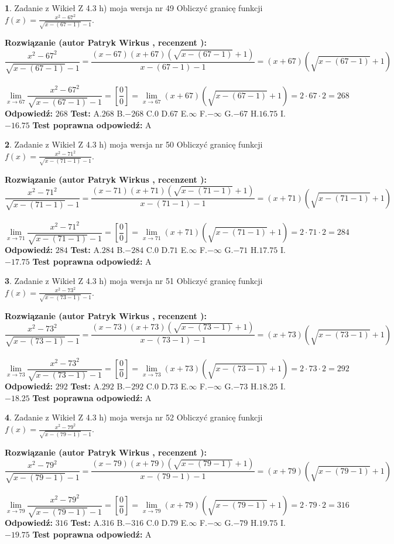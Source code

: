 \documentclass[12pt, a4paper]{article}
\theoremstyle{definition} %
\newtheorem{zad}{}
\newcommand{\zadStart}[1]{\begin{zad}#1\newline}
\newcommand{\zadStop}{\end{zad}}
\newcommand{\rozwStart}[2]{\noindent \textbf{Rozwiązanie (autor #1 , recenzent #2): }\newline}
\newcommand{\rozwStop}{\newline}
\newcommand{\odpStart}{\noindent \textbf{Odpowiedź:}\newline}
\newcommand{\odpStop}{\newline}
\newcommand{\testStart}{\noindent \textbf{Test:}\newline}
\newcommand{\testStop}{\newline}
\newcommand{\kluczStart}{\noindent \textbf{Test poprawna odpowiedź:}\newline}
\newcommand{\kluczStop}{\newline}
\begin{document}
\zadStart{Zadanie z Wikieł Z 4.3 h) moja wersja nr 49}
Obliczyć granicę funkcji $f(x)=\frac{x^{2} - 67^{2}}{\sqrt{x-(67-1)}-1}$.
\zadStop
\rozwStart{Patryk Wirkus}{}
$$\frac{x^{2} - 67^{2}}{\sqrt{x-(67-1)}-1}=\frac{(x-67)(x+67)(\sqrt{x-(67-1)}+1)}{x-(67-1)-1}=(x+67)(\sqrt{x-(67-1)}+1)$$
\\
$$\lim\limits_{x\to 67}\frac{x^{2} - 67^{2}}{\sqrt{x-(67-1)}-1}=[\frac{0}{0}]=
\lim\limits_{x\to 67}(x+67)(\sqrt{x-(67-1)}+1) = 2\cdot67 \cdot 2 = 268$$
\rozwStop
\odpStart
$268$
\odpStop
\testStart
A.$268$
B.$-268$
C.$0$
D.$67$
E.$\infty$
F.$-\infty$
G.$-67$
H.$16.75$
I.$-16.75$
\testStop
\kluczStart
A
\kluczStop



\zadStart{Zadanie z Wikieł Z 4.3 h) moja wersja nr 50}
Obliczyć granicę funkcji $f(x)=\frac{x^{2} - 71^{2}}{\sqrt{x-(71-1)}-1}$.
\zadStop
\rozwStart{Patryk Wirkus}{}
$$\frac{x^{2} - 71^{2}}{\sqrt{x-(71-1)}-1}=\frac{(x-71)(x+71)(\sqrt{x-(71-1)}+1)}{x-(71-1)-1}=(x+71)(\sqrt{x-(71-1)}+1)$$
\\
$$\lim\limits_{x\to 71}\frac{x^{2} - 71^{2}}{\sqrt{x-(71-1)}-1}=[\frac{0}{0}]=
\lim\limits_{x\to 71}(x+71)(\sqrt{x-(71-1)}+1) = 2\cdot71 \cdot 2 = 284$$
\rozwStop
\odpStart
$284$
\odpStop
\testStart
A.$284$
B.$-284$
C.$0$
D.$71$
E.$\infty$
F.$-\infty$
G.$-71$
H.$17.75$
I.$-17.75$
\testStop
\kluczStart
A
\kluczStop



\zadStart{Zadanie z Wikieł Z 4.3 h) moja wersja nr 51}
Obliczyć granicę funkcji $f(x)=\frac{x^{2} - 73^{2}}{\sqrt{x-(73-1)}-1}$.
\zadStop
\rozwStart{Patryk Wirkus}{}
$$\frac{x^{2} - 73^{2}}{\sqrt{x-(73-1)}-1}=\frac{(x-73)(x+73)(\sqrt{x-(73-1)}+1)}{x-(73-1)-1}=(x+73)(\sqrt{x-(73-1)}+1)$$
\\
$$\lim\limits_{x\to 73}\frac{x^{2} - 73^{2}}{\sqrt{x-(73-1)}-1}=[\frac{0}{0}]=
\lim\limits_{x\to 73}(x+73)(\sqrt{x-(73-1)}+1) = 2\cdot73 \cdot 2 = 292$$
\rozwStop
\odpStart
$292$
\odpStop
\testStart
A.$292$
B.$-292$
C.$0$
D.$73$
E.$\infty$
F.$-\infty$
G.$-73$
H.$18.25$
I.$-18.25$
\testStop
\kluczStart
A
\kluczStop



\zadStart{Zadanie z Wikieł Z 4.3 h) moja wersja nr 52}
Obliczyć granicę funkcji $f(x)=\frac{x^{2} - 79^{2}}{\sqrt{x-(79-1)}-1}$.
\zadStop
\rozwStart{Patryk Wirkus}{}
$$\frac{x^{2} - 79^{2}}{\sqrt{x-(79-1)}-1}=\frac{(x-79)(x+79)(\sqrt{x-(79-1)}+1)}{x-(79-1)-1}=(x+79)(\sqrt{x-(79-1)}+1)$$
\\
$$\lim\limits_{x\to 79}\frac{x^{2} - 79^{2}}{\sqrt{x-(79-1)}-1}=[\frac{0}{0}]=
\lim\limits_{x\to 79}(x+79)(\sqrt{x-(79-1)}+1) = 2\cdot79 \cdot 2 = 316$$
\rozwStop
\odpStart
$316$
\odpStop
\testStart
A.$316$
B.$-316$
C.$0$
D.$79$
E.$\infty$
F.$-\infty$
G.$-79$
H.$19.75$
I.$-19.75$
\testStop
\kluczStart
A
\kluczStop
\end{document}
